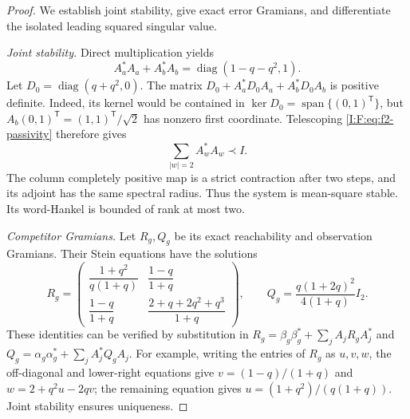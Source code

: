 \begin{proof}
We establish joint stability, give exact error Gramians, and differentiate
the isolated leading squared singular value.

\emph{Joint stability.}
Direct multiplication yields
\begin{equation}
 A_a^*A_a+A_b^*A_b
   =\operatorname{diag}(1-q-q^2,1).
 \label{I:F:eq:f2-passivity}
\end{equation}
Let $D_0=\operatorname{diag}(q+q^2,0)$. The matrix
$D_0+A_a^*D_0A_a+A_b^*D_0A_b$ is positive definite. Indeed, its kernel
would be contained in $\ker D_0=\operatorname{span}\{(0,1)^{\mathsf T}\}$, but
$A_b(0,1)^{\mathsf T}=(1,1)^{\mathsf T}/\sqrt2$ has nonzero first coordinate.
Telescoping \eqref{I:F:eq:f2-passivity} therefore gives
\[
 \sum_{|w|=2}A_w^*A_w\prec I.
\]
The column completely positive map is a strict contraction after two
steps, and its adjoint has the same spectral radius. Thus the system is
mean-square stable. Its word-Hankel is bounded of rank at most two.

\emph{Competitor Gramians.}
Let $R_g,Q_g$ be its exact reachability and observation Gramians. Their
Stein equations have the solutions
\begin{equation}
 R_g=\begin{pmatrix}
 \dfrac{1+q^2}{q(1+q)}&\dfrac{1-q}{1+q}\\[4pt]
 \dfrac{1-q}{1+q}&\dfrac{2+q+2q^2+q^3}{1+q}
 \end{pmatrix},\qquad
 Q_g=\frac{q(1+2q)^2}{4(1+q)}I_2.
 \label{I:F:eq:f2-own-gramians}
\end{equation}
These identities can be verified by substitution in
$R_g=\beta_g\beta_g^*+\sum_j A_jR_gA_j^*$ and
$Q_g=\alpha_g\alpha_g^*+\sum_j A_j^*Q_gA_j$.
For example, writing the entries of $R_g$ as $u,v,w$, the off-diagonal
and lower-right equations give
$v=(1-q)/(1+q)$ and $w=2+q^2u-2qv$; the remaining equation gives
$u=(1+q^2)/(q(1+q))$. Joint stability ensures uniqueness.


\end{proof}
